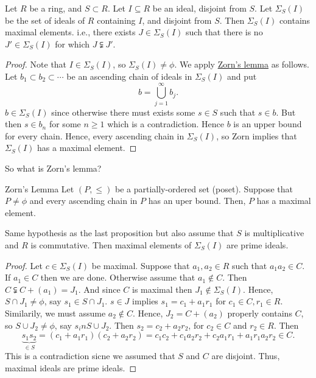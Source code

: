 \documentclass[twoside, openright, fontsize=10pt, headings=big]{scrbook}
\begin{document}
\begin{proposition}{}{}
    Let $R$ be a ring, and $S\subset R$. Let $I\subseteq R$ be an ideal, disjoint from $S$. Let $\Sigma_S(I)$ be the set of ideals of $R$ containing $I$, and disjoint from $S$. Then $\Sigma_S(I)$ contains maximal elements. i.e., there exists $J\in\Sigma_S(I)$ such that there is no $J'\in\Sigma_S(I)$ for which $J\subsetneqq J'$.
\end{proposition}
\begin{proof}
    Note that $I\in\Sigma_S(I)$, so $\Sigma_S(I)\neq\phi$. We apply \underline{Zorn's lemma} as follows. Let $b_1\subset b_2\subset\cdots$ be an ascending chain of ideals in $\Sigma_S(I)$ and put
    \[
        b=\bigcup_{j=1}^\infty b_j.
    \]
    $b\in\Sigma_S(I)$ since otherwise there must exists some $s\in S$ such that $s\in b$. But then $s\in b_n$ for some $n\geq 1$ which is a contradiction. Hence $b$ is an upper bound for every chain. Hence, every ascending chain in $\Sigma_S(I)$, so Zorn implies that $\Sigma_S(I)$ has a maximal element. 
\end{proof}
So what is Zorn's lemma?
\begin{lemma}{Zorn's Lemma}{}
    Let $(P,\leq)$ be a partially-ordered set (poset). Suppose that $P\neq\phi$ and every ascending chain in $P$ has an uper bound. Then, $P$ has a maximal element. 
\end{lemma}
\begin{proposition}
    Same hypothesis as the last proposition but also assume that $S$ is multiplicative and $R$ is commutative. Then maximal elements of $\Sigma_S(I)$ are prime ideals. 
\end{proposition}
\begin{proof}
    Let $c\in\Sigma_S(I)$ be maximal. Suppose that $a_1,a_2\in R$ such that $a_1a_2\in C$. If $a_1\in C$ then we are done. Otherwise assume that $a_1\not\in C$. Then $C\subsetneqq C+(a_1)=J_1$. And since $C$ is maximal then $J_1\not\in\Sigma_S(I)$. Hence, $S\cap J_1\neq\phi$, say $s_1\in S\cap J_1$. $s\in J$ implies $s_1=c_1+a_1r_1$ for $c_1\in C,r_1\in R$. Similarily, we must assume $a_2\not\in C$. Hence, $J_2=C+(a_2)$ properly contains $C$, so $S\cup J_2\neq\phi$, say $s_in S\cup J_2$. Then $s_2=c_2+a_2r_2$, for $c_2\in C$ and $r_2\in R$. Then 
    \[
        \underbrace{s_1s_2}_{\in S}=(c_1+a_1r_1)(c_2+a_2r_2)=c_1c_2+c_1a_2r_2+c_2a_1r_1+a_1r_1a_2r_2\in C.
    \]
    This is a contradiction sicne we assumed that $S$ and $C$ are disjoint. Thus, maximal ideals are prime ideals. 
\end{proof}
\end{document}
